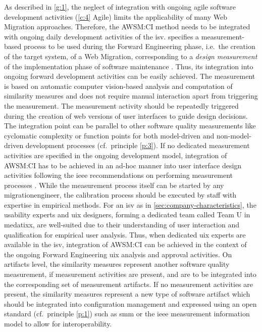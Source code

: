 As described in \cref{g:1}, the neglect of integration with ongoing agile software development activities (\cref{c:4} Agile) limits the applicability of many \gls{Web Migration} approaches.
Therefore, the AWSM:CI method needs to be integrated with ongoing daily development activities of the \gls{isv}.
 specifies a measurement-based process to be used during the \gls{Forward Engineering} phase, i.e.~the creation of the \gls{target system}, of a \gls{Web Migration}, corresponding to a \emph{design measurement} of the implementation phase of software maintenance \autocite{IEEE1219Maintenance}.
Thus, its integration into ongoing forward development activities can be easily achieved.
The measurement is based on automatic computer vision-based analysis and computation of similarity measures and does not require manual interaction apart from triggering the measurement.
The measurement activity should be repeatedly triggered during the creation of \gls{web} versions of user interfaces to guide design decisions.
The integration point can be parallel to other software quality measurements like cyclomatic complexity or function points \autocite{Kan1996Metrics} for both model-driven and non-model-driven development processes (cf.~principle \cref{p:3}).
If no dedicated measurement activities are specified in the ongoing development model, integration of AWSM:CI has to be achieved in an ad-hoc manner into user interface design activities following the \gls{ieee} recommendations on performing measurement processes \autocite{SWEBOK2014}.
While the measurement process itself can be started by any \gls{migrationengineer}, the calibration process  should be executed by staff with expertise in empirical methods.
For an \gls{isv} as in \cref{sec:company-characteristics}, the usability experts and \gls{uix} designers, forming a dedicated team called Team U in medatixx, are well-suited due to their understanding of user interaction and qualification for empirical user analysis.
Thus, when dedicated \gls{uix} experts are available in the \gls{isv}, integration of AWSM:CI can be achieved in the context of the ongoing \gls{Forward Engineering} \gls{uix} analysis and approval activities.
On \glspl{artifact} level, the similarity measures represent another software quality measurement, if measurement activities are present, and are to be integrated into the corresponding set of measurement \glspl{artifact}.
If no measurement activities are present, the similarity measures represent a new type of software \gls{artifact} which should be integrated into configuration management and expressed using an open standard (cf.~principle \cref{p:1}) such as \gls{smm} \autocite{OMG2012SMM} or the \gls{ieee} measurement information model \autocite{ISO/IEEE2017Measurement} to allow for interoperability.

